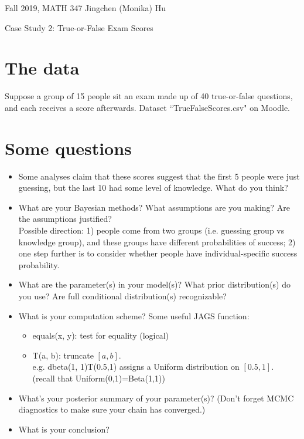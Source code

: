\documentclass[11pt]{article}
\begin{document}
\enlargethispage{\baselineskip}

Fall 2019, MATH 347 \hfill Jingchen (Monika) Hu\\

\begin{center}
{\huge Case Study 2: True-or-False Exam Scores}	
\end{center}
\vspace{0.5cm}


\section{The data} 

Suppose a group of 15 people sit an exam made up of 40 true-or-false questions, and each receives a score afterwards. Dataset ``TrueFalseScores.csv" on Moodle.

\section{Some questions} 

\begin{itemize}
\item[1.] Some analyses claim that these scores suggest that the first 5 people were just guessing, but the last 10 had some level of knowledge. What do you think?

\item[2.] What are your Bayesian methods? What assumptions are you making? Are the assumptions justified?\\

Possible direction: 1) people come from two groups (i.e. guessing group vs knowledge group), and these groups have different probabilities of success; 2) one step further is to consider whether people have individual-specific success probability.

\item[3.] What are the parameter(s) in your model(s)? What prior distribution(s) do you use? Are full conditional distribution(s) recognizable?

\item[4.] What is your computation scheme? Some useful JAGS function:
\begin{itemize}
\item[(a)] equals(x, y): test for equality (logical)
\item[(b)] T(a, b): truncate $[a, b]$.\\
 e.g. dbeta(1, 1)T(0.5,1) assigns a Uniform distribution on $[0.5, 1]$.\\
 (recall that Uniform(0,1)=Beta(1,1))
\end{itemize}

\item[5.] What's your posterior summary of your parameter(s)? (Don't forget MCMC diagnostics to make sure your chain has converged.)

\item[6.] What is your conclusion?
\end{itemize}
\end{document}
